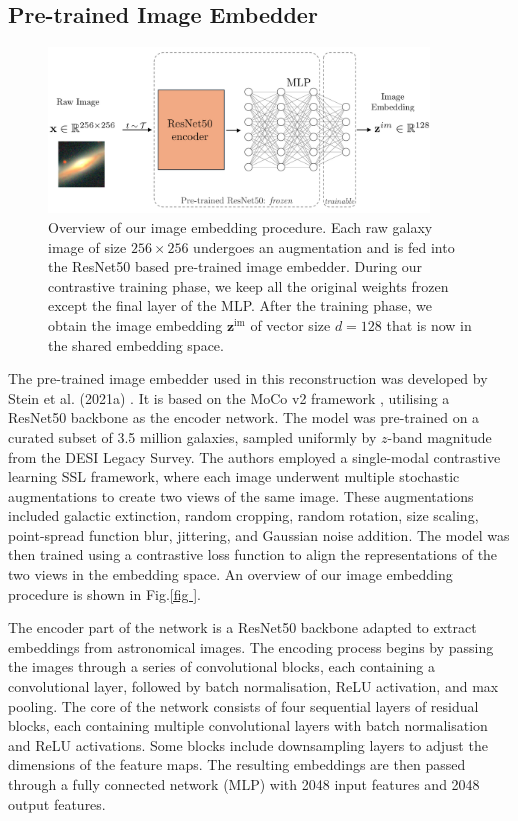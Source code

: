 \documentclass[a4paper,12pt]{article}
\begin{document}
\subsection{Pre-trained Image Embedder} 
\begin{figure}[H]
    \centering
    \includegraphics[width=0.9\textwidth]{../figures/diagram_resnet.pdf}
    \caption{Overview of our image embedding procedure. Each raw galaxy image of size $256 \times 256$ undergoes an augmentation and is fed into the ResNet50 based pre-trained image embedder. During our contrastive training phase, we keep all the original weights frozen except the final layer of the MLP. After the training phase, we obtain the image embedding $\mathbf{z}^{\text{im}}$ of vector size $d=128$ that is now in the shared embedding space.}
    \label{fig:resnet}
\end{figure}
The pre-trained image embedder used in this reconstruction was developed by Stein et al. (2021a) \cite{stein}. It is based on the MoCo v2 framework \cite{mocov2}, utilising a ResNet50 backbone as the encoder network. The model was pre-trained on a curated subset of 3.5 million galaxies, sampled uniformly by $z$-band magnitude from the DESI Legacy Survey. The authors employed a single-modal contrastive learning SSL framework, where each image underwent multiple stochastic augmentations to create two views of the same image. These augmentations included galactic extinction, random cropping, random rotation, size scaling, point-spread function blur, jittering, and Gaussian noise addition. The model was then trained using a contrastive loss function to align the representations of the two views in the embedding space. An overview of our image embedding procedure is shown in Fig.\ref{fig
}.

The encoder part of the network is a ResNet50 backbone adapted to extract embeddings from astronomical images. The encoding process begins by passing the images through a series of convolutional blocks, each containing a convolutional layer, followed by batch normalisation, ReLU activation, and max pooling. The core of the network consists of four sequential layers of residual blocks, each containing multiple convolutional layers with batch normalisation and ReLU activations. Some blocks include downsampling layers to adjust the dimensions of the feature maps. The resulting embeddings are then passed through a fully connected network (MLP) with 2048 input features and 2048 output features.
\end{document}
